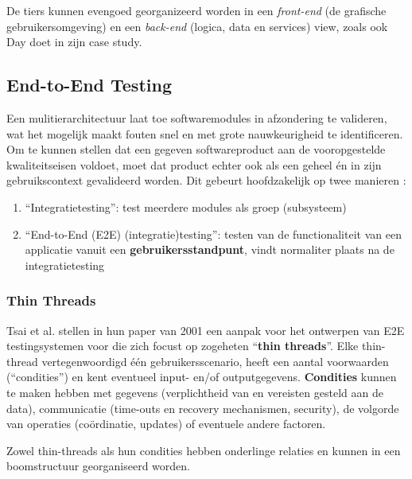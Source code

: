 De tiers kunnen evengoed georganizeerd worden in een \emph{front-end} (de grafische gebruikersomgeving) en een \emph{back-end} (logica, data en services) view, zoals ook Day doet in zijn case study.

\subsection{End-to-End Testing}

Een mulitierarchitectuur laat toe softwaremodules in afzondering te valideren, wat het mogelijk maakt fouten snel en met grote nauwkeurigheid te identificeren. Om te kunnen stellen dat een gegeven softwareproduct aan de vooropgestelde kwaliteitseisen voldoet, moet dat product echter ook als een geheel én in zijn gebruikscontext gevalideerd worden. Dit gebeurt hoofdzakelijk op twee manieren \cite{Tsai2001}:

\begin{enumerate}
    \item ``Integratietesting'': test meerdere modules als groep (subsysteem) 
    \item ``End-to-End (E2E) (integratie)testing'': testen van de functionaliteit van een applicatie vanuit een \textbf{gebruikersstandpunt}, vindt normaliter plaats na de integratietesting
\end{enumerate}

\subsubsection{Thin Threads}

Tsai et al. stellen in hun paper van 2001 een aanpak voor het ontwerpen van E2E testingsystemen voor die zich focust op zogeheten ``\textbf{thin threads}''. Elke thin-thread vertegenwoordigd één gebruikersscenario, heeft een aantal voorwaarden (``condities'') en kent eventueel input- en/of outputgegevens. \textbf{Condities} kunnen te maken hebben met gegevens (verplichtheid van en vereisten gesteld aan de data), communicatie (time-outs en recovery mechanismen, security), de volgorde van operaties (coördinatie, updates) of eventuele andere factoren.

Zowel thin-threads als hun condities hebben onderlinge relaties en kunnen in een boomstructuur georganiseerd worden.

